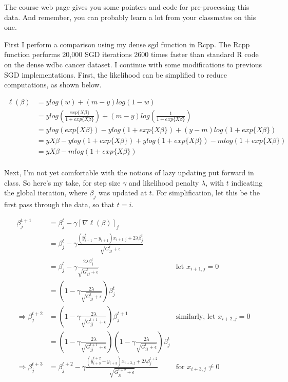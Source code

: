 \documentclass{article}
\begin{document}
The course web page gives you some pointers and code for pre-processing this data.  And remember, you can probably learn a lot from your classmates on this one.

\color{blue}
First I perform a comparison using my dense sgd function in Rcpp. The Rcpp function performs 20,000 SGD iterations 2600 times faster than standard R code on the dense wdbc cancer dataset. I continue with some modifications to previous SGD implementations. First, the likelihood can be simplified to reduce computations, as shown below. 

        
\begin{align*}
\ell (\beta) &= y log(w) + (m-y)log(1-w)\\
&= y log\left(\frac{exp\{X\beta\}}{1+exp\{X\beta\}}\right) + (m-y)log\left(\frac{1}{1+exp\{X\beta\}}\right)\\
&= y log\left(exp\{X\beta\}\right)  - y log\left(1+exp\{X\beta\}\right) + (y-m)log\left(1+exp\{X\beta\}\right)\\
&= y X\beta  - y log\left(1+exp\{X\beta\}\right) + y log\left(1+exp\{X\beta\}\right)-m log\left(1+exp\{X\beta\}\right)\\
&= y X\beta  -m log\left(1+exp\{X\beta\}\right)\\
\end{align*}

Next, I'm not yet comfortable with the notions of lazy updating put forward in class. So here's my take, for step size $\gamma$ and likelihood penalty $\lambda$, with $t$ indicating the global iteration, where $\beta_j$ was updated at $t$. For simplification, let this be the first pass through the data, so that $t=i$.

\begin{align*}
\beta_j^{t+1} &=\beta_j^t - \gamma [\nabla \ell(\beta)]_j \\
&=\beta_j^t - \gamma \frac{(\hat{y}_{i+1}^t - y_{i+1})x_{i+1,j} + 2 \lambda \beta_j^t}{\sqrt{G_{jj}^t + \epsilon}} \\
&=\beta_j^t - \gamma \frac{2 \lambda \beta_j^t}{\sqrt{G_{jj}^t + \epsilon}} & \text{let }x_{i+1,j}=0\\
&=\left(1 - \gamma \frac{2 \lambda}{\sqrt{G_{jj}^t + \epsilon}}\right)\beta_j^t\\
\Rightarrow \beta_j^{t+2} &= \left(1 - \gamma \frac{2 \lambda}{\sqrt{G_{jj}^{t+1} + \epsilon}}\right)\beta_j^{t+1} & \text{similarly, let }x_{i+2,j} = 0 \\
 &= \left(1 - \gamma \frac{2 \lambda}{\sqrt{G_{jj}^{t+1} + \epsilon}}\right)\left(1 - \gamma \frac{2 \lambda}{\sqrt{G_{jj}^t + \epsilon}}\right)\beta_j^t \\
\Rightarrow \beta_j^{t+3} &= \beta_j^{t+2} - \gamma \frac{(\hat{y}_{i+3}^{t+2} - y_{i+3})x_{i+3,j} + 2 \lambda \beta_j^{t+2}}{\sqrt{G_{jj}^{t+2} + \epsilon}} & \text{for }x_{i+3,j} \ne 0 \\
\end{align*}
\end{document}

